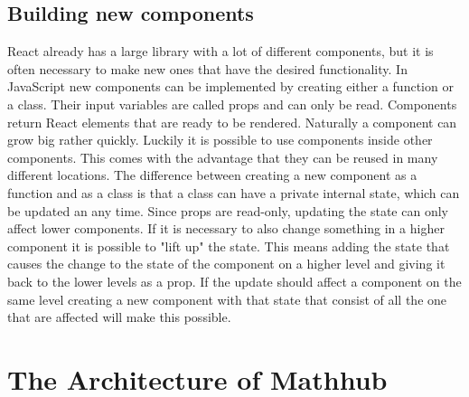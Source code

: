 \documentclass[11pt,a4paper]{article}
\begin{document}
	\subsection{Building new components}
	React already has a large library with a lot of different components, but it is often necessary to make new ones that have the desired functionality. In JavaScript new components can be implemented by creating either a function or a class. Their input variables are called props and can only be read. Components return React elements that are ready to be rendered. Naturally a component can grow big rather quickly. Luckily it is possible to use components inside other components. This comes with the advantage that they can be reused in many different locations. The difference between creating a new component as a function and as a class is that a class can have a private internal state, which can be updated an any time. Since props are read-only, updating the state can only affect lower components. If it is necessary to also change something in a higher component it is possible to "lift up" the state. This means adding the state that causes the change to the state of the component on a higher level and giving it back to the lower levels as a prop. If the update should affect a component on the same level creating a new component with that state that consist of all the one that are affected will  make this possible.

\section{The Architecture of Mathhub}
\end{document}
